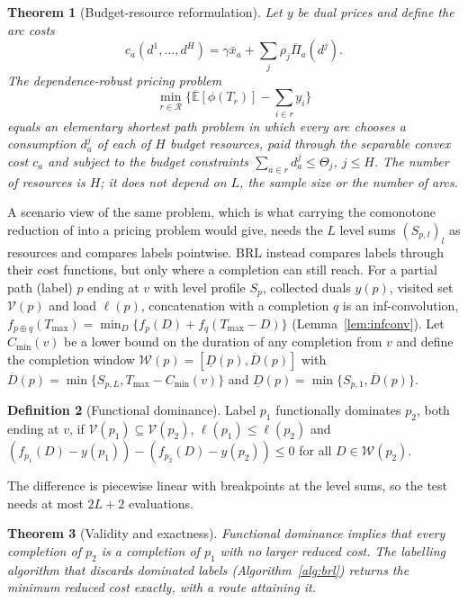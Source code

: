 \documentclass[preprint,12pt]{elsarticle}
\newtheorem{theorem}{Theorem}
\theoremstyle{definition}
\newtheorem{definition}[theorem]{Definition}
\theoremstyle{remark}
\newcommand{\cR}{\mathcal{R}}
\newcommand{\Eu}{\overline{\mathbb{E}}}
\newcommand{\Pib}{\overline{\Pi}}
\newcommand{\xb}{\bar x}
\newcommand{\Dl}{\underline{D}}
\newcommand{\Dh}{\overline{D}}
\begin{document}
\begin{theorem}[Budget-resource reformulation]\label{thm:resource}
Let $y$ be dual prices and define the arc costs \[c_a(d^1,\dots,d^H)=\gamma\xb_a+\sum_j\rho_j\Pib_a(d^j).\] The dependence-robust pricing problem \[\min_{r\in\cR}\Big\{\Eu[\phi(T_r)]-\sum_{i\in r}y_i\Big\}\] equals an elementary shortest path problem in which every arc chooses a consumption $d^j_a$ of each of $H$ budget resources, paid through the separable convex cost $c_a$ and subject to the budget constraints $\sum_{a\in r}d^j_a\le\Theta_j$, $j\le H$. The number of resources is $H$; it does not depend on $L$, the sample size or the number of arcs.
\end{theorem}

A scenario view of the same problem, which is what carrying the comonotone reduction of \citet{GhosalHoWiesemann2024} into a pricing problem would give, needs the $L$ level sums $(S_{p,l})_l$ as resources and compares labels pointwise. BRL instead compares labels through their cost functions, but only where a completion can still reach. For a partial path (label) $p$ ending at $v$ with level profile $S_p$, collected duals $y(p)$, visited set $\mathcal V(p)$ and load $\ell(p)$, concatenation with a completion $q$ is an inf-convolution, $f_{p\oplus q}(T_{\max})=\min_D\{f_p(D)+f_q(T_{\max}-D)\}$ (Lemma~\ref{lem:infconv}). Let $C_{\min}(v)$ be a lower bound on the duration of any completion from $v$ and define the completion window $\mathcal W(p)=[\Dl(p),\Dh(p)]$ with $\Dh(p)=\min\{S_{p,L},T_{\max}-C_{\min}(v)\}$ and $\Dl(p)=\min\{S_{p,1},\Dh(p)\}$.

\begin{definition}[Functional dominance]\label{def:fdom}
Label $p_1$ functionally dominates $p_2$, both ending at $v$, if $\mathcal V(p_1)\subseteq\mathcal V(p_2)$, $\ell(p_1)\le\ell(p_2)$ and $(f_{p_1}(D)-y(p_1))-(f_{p_2}(D)-y(p_2))\le0$ for all $D\in\mathcal W(p_2)$.
\end{definition}

The difference is piecewise linear with breakpoints at the level sums, so the test needs at most $2L+2$ evaluations.

\begin{theorem}[Validity and exactness]\label{thm:fdom}
Functional dominance implies that every completion of $p_2$ is a completion of $p_1$ with no larger reduced cost. The labelling algorithm that discards dominated labels (Algorithm~\ref{alg:brl}) returns the minimum reduced cost exactly, with a route attaining it.
\end{theorem}
\end{document}
